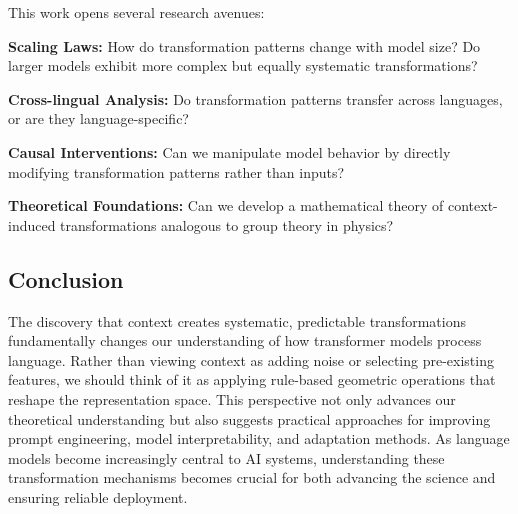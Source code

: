 This work opens several research avenues:

\textbf{Scaling Laws:} How do transformation patterns change with model size? Do larger models exhibit more complex but equally systematic transformations?

\textbf{Cross-lingual Analysis:} Do transformation patterns transfer across languages, or are they language-specific?

\textbf{Causal Interventions:} Can we manipulate model behavior by directly modifying transformation patterns rather than inputs?

\textbf{Theoretical Foundations:} Can we develop a mathematical theory of context-induced transformations analogous to group theory in physics?

\subsection{Conclusion}

The discovery that context creates systematic, predictable transformations fundamentally changes our understanding of how transformer models process language. Rather than viewing context as adding noise or selecting pre-existing features, we should think of it as applying rule-based geometric operations that reshape the representation space. This perspective not only advances our theoretical understanding but also suggests practical approaches for improving prompt engineering, model interpretability, and adaptation methods. As language models become increasingly central to AI systems, understanding these transformation mechanisms becomes crucial for both advancing the science and ensuring reliable deployment.